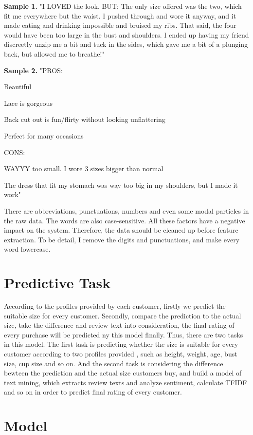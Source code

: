 \documentclass[letterpaper, 10 pt, conference]{ieeeconf}  %
\begin{document}
\textbf{Sample 1.} "I LOVED the look, BUT: The only size offered was the two, which fit me everywhere but the waist. I pushed through and wore it anyway, and it made eating and drinking impossible and bruised my ribs. That said, the four would have been too large in the bust and shoulders. I ended up having my friend discreetly unzip me a bit and tuck in the sides, which gave me a bit of a plunging back, but allowed me to breathe!"

\textbf{Sample 2.} "PROS: 

Beautiful

Lace is gorgeous

Back cut out is fun/flirty without looking unflattering

Perfect for many occasions


CONS: 

WAYYY too small. I wore 3 sizes bigger than normal

The dress that fit my stomach was way too big in my shoulders, but I made it work"



There are abbreviations, punctuations, numbers and even some modal particles in the raw data. The words are also case-sensitive. All these factors have a negative impact on the system. Therefore, the data should be cleaned up before feature extraction. To be detail, I remove the digits and punctuations, and make every word lowercase.



\section{Predictive Task}
According to the profiles provided by each customer, firstly we predict the suitable size for every customer. Secondly, compare the prediction to the actual size, take the difference and review text into consideration, the final rating of every purchase will be predicted ny this model finally.
Thus, there are two tasks in this model. The first task is predicting whether the size is suitable for every customer according to two profiles provided , such as height, weight, age, bust size, cup size and so on. And the second task is considering the difference bewteen the prediction and the actual size customers buy,
 and build a model of text mining, which extracts review texts and analyze sentiment, calculate TFIDF and so on in order to predict final rating of every customer.


\section{Model}
\end{document}
